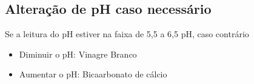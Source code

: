 \subsection{Alteração de pH caso necessário}

Se a leitura do pH estiver na faixa de 5,5 a 6,5 pH, caso contrário

\begin{itemize}
	\item Diminuir o pH: Vinagre Branco
	\item Aumentar o pH: Bicaarbonato de cálcio
\end{itemize}

